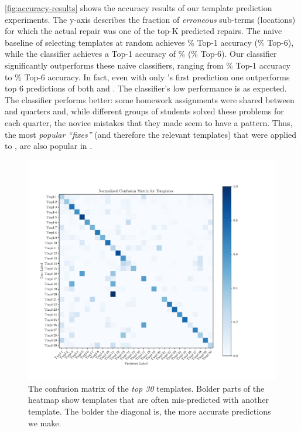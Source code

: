 %
\autoref{fig:accuracy-results} shows the accuracy results of our template
prediction experiments. The y-axis describes the fraction of \emph{erroneous}
sub-terms (locations) for which the actual repair was one of the top-K predicted 
repairs.
%
The naive baseline of selecting templates at random achieves 
\RandomTopOne\% Top-1 accuracy (\RandomTopSix\% Top-6), while 
the \popular classifier achieves a Top-1 accuracy of \PopularTopOne\%
(\PopularTopSix\% Top-6).
%
Our \dnn classifier significantly outperforms these naive 
classifiers, ranging from \DnnTopOne\% Top-1 accuracy to 
\DnnTopSix\% Top-6 accuracy. 
%
In fact, even with only \dnn's first prediction one
outperforms top 6 predictions of both \random and \popular.
%
The \random classifier's low performance is as expected.
%
The \popular classifier performs better: some homework assignments 
were shared between \SPRING and \FALL quarters and, while different 
groups of students solved these problems for each quarter, the novice
mistakes that they made seem to have a pattern. Thus, the most
\emph{popular ``fixes''} (and therefore the relevant templates) 
that were applied to \SPRING, are also popular in \FALL. 



\begin{figure}[t]
  \centering
  \includegraphics[trim={30 40 100 70},clip,width=\linewidth]{evaluation-conf-matrix.pdf}
  \caption{The confusion matrix of the \emph{top 30} templates. Bolder parts of
  the heatmap show templates that are often mis-predicted with another template.
  The bolder the diagonal is, the more accurate predictions we make.}
  \label{fig:conf-matrix}
\end{figure}

